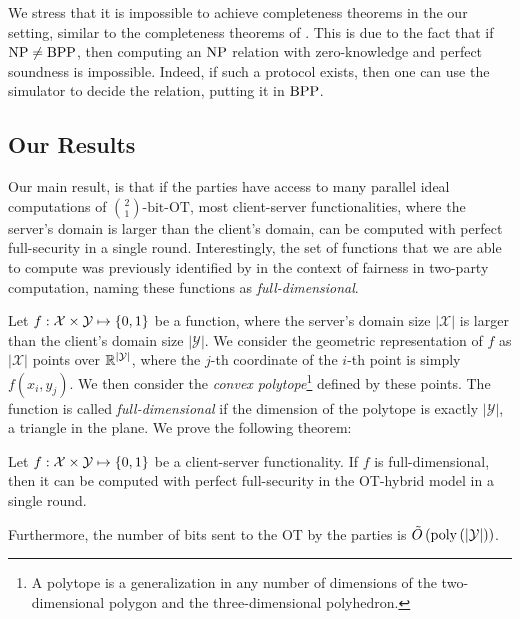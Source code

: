 \documentclass{llncs}
\newcommand{\bOT}[2]{\binom{#2}{#1}\text{-bit-OT}}
\newcommand{\sOT}[3]{\binom{#2}{#1}\text{-}#3\text{-string-OT}}
\newcommand{\X}{\mathcal{X}}
\newcommand{\Y}{\mathcal{Y}}
\begin{document}
We stress that it is impossible to achieve completeness theorems in the our setting, similar to the completeness theorems of \citet{Kilian00}. This is due to the fact that if $\mathrm{NP}\ne\mathrm{BPP}$, then computing an $\mathrm{NP}$ relation with zero-knowledge and perfect soundness is impossible. Indeed, if such a protocol exists, then one can use the simulator to decide the relation, putting it in $\mathrm{BPP}$.


\subsection{Our Results}\label{sec:results}
Our main result, is that if the parties have access to many parallel ideal computations of $\bOT12$, most client-server functionalities, where the server's domain is larger than the client's domain, can be computed with perfect full-security in a single round. Interestingly, the set of functions that we are able to compute was previously identified by \citet{Ash14} in the context of fairness in two-party computation, naming these functions as \emph{full-dimensional}. 

Let $f : \X \times \Y \mapsto \zo$ be a function, where the server's domain size $|\X|$ is larger than the client's domain size $|\Y|$. We consider the geometric representation of $f$ as $|\X|$ points over $\R^{|\Y|}$, where the $j$-th coordinate of the $i$-th
point is simply $f(x_i, y_j)$. We then consider the \emph{convex polytope}\footnote{A polytope is a generalization in any number of dimensions of the two-dimensional polygon and the three-dimensional polyhedron.} defined by these points. The function is called \emph{full-dimensional} if the dimension of the polytope is exactly $|\Y|$, \eg a triangle in the plane.  We prove the following theorem:

\begin{theorem}[Informal]\label{thm:introMain}
	Let $f:\X \times \Y \mapsto \zo$ be a client-server functionality. If $f$ is full-dimensional, then it can be computed with perfect full-security in the OT-hybrid model in a single round. 
    
    Furthermore, the number of bits sent to the OT by the parties is $\tilde{O}\of{\poly\of{|\Y|}}$.
\end{theorem}
\end{document}

